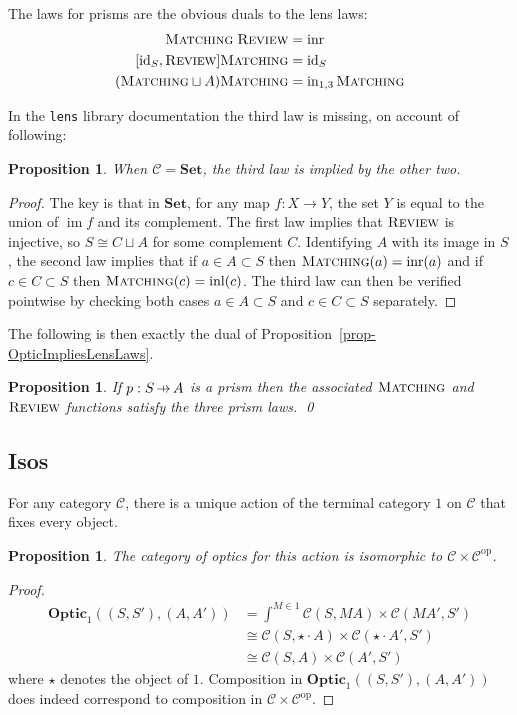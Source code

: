 \documentclass[11pt,a4paper]{article}
\theoremstyle{plain}
\newtheorem{proposition}[theorem]{Proposition}
\theoremstyle{definition}
\newcommand{\C}{\mathscr{C}}
\newcommand{\lenslib}{\texttt{lens}}
\newcommand{\Set}{\mathbf{Set}}
\newcommand{\Optic}{\mathbf{Optic}}
\newcommand{\id}{\mathrm{id}}
\newcommand{\op}{\mathrm{op}}
\newcommand{\inl}{\mathrm{inl}}
\newcommand{\inr}{\mathrm{inr}}
\DeclareMathOperator{\im}{im}
\newcommand{\freview}{\textsc{Review}}
\newcommand{\fmatching}{\textsc{Matching}}
\newcommand{\hto}{\ensuremath{\,\mathaccent\shortmid\rightarrow\,}}
\begin{document}
The laws for prisms are the obvious duals to the lens laws:
\begin{align*}
  \fmatching \; \freview &= \inr \\
  [\id_S, \freview] \fmatching &= \id_S \\
  (\fmatching \sqcup A) \fmatching &= \mathrm{in}_{1,3} \, \fmatching
\end{align*}

In the \lenslib{} library documentation the third law is missing, on account of following:

\begin{proposition}
  When $\C = \Set$, the third law is implied by the other two.
\end{proposition}
\begin{proof}
  The key is that in $\Set$, for any map $f : X \to Y$, the set $Y$ is equal to the union of $\im f$ and its complement. The first law implies that $\freview$ is injective, so $S \cong C \sqcup A$ for some complement $C$. Identifying $A$ with its image in $S$, the second law implies that if $a\in A \subset S$ then $\fmatching(a) = \inr(a)$ and if $c\in C \subset S$ then $\fmatching(c) = \inl(c)$. The third law can then be verified pointwise by checking both cases $a\in A \subset S$ and $c\in C \subset S$ separately.
\end{proof}

The following is then exactly the dual of Proposition~\ref{prop-OpticImpliesLensLaws}.
\begin{proposition}\label{prop-OpticImpliesPrismLaws}
  If $p : S \hto A$ is a prism then the associated $\fmatching$ and $\freview$ functions satisfy the three prism laws. \qed
\end{proposition}

\subsection{Isos}

For any category $\C$, there is a unique action of the terminal category $1$ on $\C$ that fixes every object.

\begin{proposition}
  The category of optics for this action is isomorphic to $\C \times \C^\op$.
\end{proposition}
\begin{proof}
  \begin{align*}
    \Optic_1((S, S'), (A, A')) &= \int^{M \in 1} \C(S, MA) \times \C(MA', S') \\
                               &\cong \C(S, \star \cdot A) \times \C(\star \cdot A', S') \\
                               &\cong \C(S, A) \times \C(A', S')
  \end{align*}
  where $\star$ denotes the object of $1$. Composition in $\Optic_1((S, S'), (A, A'))$ does indeed correspond to composition in $\C \times \C^\op$.
\end{proof}
\end{document}
